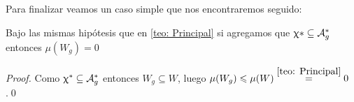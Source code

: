 Para finalizar veamos un caso simple que nos encontraremos seguido:

\begin{corollary}
	\label{coro: Resultado principal}
	Bajo las mismas hip\'otesis que en \ref{teo: Principal} si agregamos que $\mani* \subseteq \puntosfijos$ entonces $\mu(W_g) =0$
\end{corollary}

\begin{proof}
	Como $\mani^* \subseteq \puntosfijos$ entonces $W_g \subseteq W$, luego $\mu(W_g) \le \mu (W) \stackrel{\ref{teo: Principal}}{=} 0$.\qed
\end{proof}